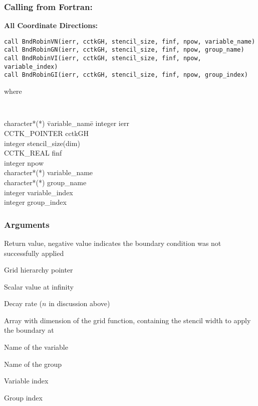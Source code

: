 \documentclass{article}
\newcommand{\entrylabel}[1]{\mbox{\textsf{#1}}\hfil}
\newenvironment{entry}
  {\begin{list}{}
    {\renewcommand{\makelabel}{\entrylabel}
      \setlength{\labelwidth}{90pt}
      \setlength{\leftmargin}{\labelwidth+\labelsep}
    }
  }
  {\end{list}}
\newlength{\Mylen}
\newcommand{\Lentrylabel}[1]{%
  \settowidth{\Mylen}{\textsf{#1}}%
  \ifthenelse{\lengthtest{\Mylen > \labelwidth}}%
    {\parbox[b]{\labelwidth} %
      {\makebox[0pt][l]{\textsf{#1}}\\}} %
    {\textsf{#1}} %

  \hfil\relax}
\newenvironment{Lentry}
  {\renewcommand{\entrylabel}{\Lentrylabel}
   \begin{entry}}
  {\end{entry}}
\begin{document}
\subsubsection*{Calling from Fortran:}
{\bf All Coordinate Directions:}
\begin{verbatim}
call BndRobinVN(ierr, cctkGH, stencil_size, finf, npow, variable_name)
call BndRobinGN(ierr, cctkGH, stencil_size, finf, npow, group_name)
call BndRobinVI(ierr, cctkGH, stencil_size, finf, npow, variable_index)
call BndRobinGI(ierr, cctkGH, stencil_size, finf, npow, group_index)
\end{verbatim}
where
{\tt
\begin{tabbing}
character*(*) \= variable\_name\=\kill
integer \> ierr \\
CCTK\_POINTER \> cctkGH\\
integer \> stencil\_size(dim)\\
CCTK\_REAL \> finf \\
integer \> npow \\
character*(*) \> variable\_name\\
character*(*) \> group\_name\\
integer \> variable\_index\\
integer \> group\_index\\
\end{tabbing}
}

\subsubsection*{Arguments}
\begin{Lentry}
\item[{\tt ierr}] Return value, negative value indicates the
boundary condition was not successfully applied
\item[{\tt cctkGH}] Grid hierarchy pointer
\item[{\tt finf}] Scalar value at infinity
\item[{\tt npow}] Decay rate ($n$ in discussion above)
\item[{\tt stencil\_size}] Array with dimension of the grid function, containing the stencil width to apply the boundary at
\item[{\tt variable\_name}] Name of the variable
\item[{\tt group\_name}] Name of the group
\item[{\tt variable\_index}] Variable index
\item[{\tt group\_index}] Group index
\end{Lentry}





\end{document}
